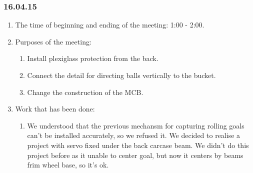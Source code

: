 \subsubsection{16.04.15}
\begin{enumerate}
	
	\item The time of beginning and ending of the meeting: 1:00 - 2:00.
	
	\item Purposes of the meeting: 
	\begin{enumerate}
		
		\item Install plexiglass protection from the back.
		
		\item Connect the detail for directing balls vertically to the bucket.
		
        \item Change the construction of the MCB.
		
	\end{enumerate}

	\item Work that has been done:
	\begin{enumerate}
		
		\item We understood that the previous mechansm for capturing rolling goals can't be installed accurately, so we refused it. We decided to realise a project with servo fixed under the back carcase beam. We didn't do this project before as it unable to center goal, but now it centers by beams frim wheel base, so it's ok.
		\begin{figure}[H]
			\begin{minipage}[h]{0.2\linewidth}
				\center  
			\end{minipage}
			\begin{minipage}[h]{0.6\linewidth}
				\caption{}
			\end{minipage}
		\end{figure}
		

\end{enumerate}
\end{enumerate}
